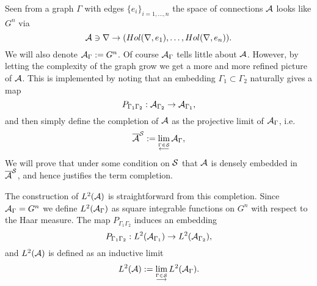 \documentclass[12pt]{article}
\def\ca{{\cal A}}
\def\cs{{\cal S}}
\begin{document}
Seen from a graph $\Gamma$ with edges $\{e_i\}_{i=1,\ldots ,n}$ the space of connections $\ca$ looks like $G^{n}$ via
$$\ca \ni \nabla \to (Hol(\nabla, e_1 ),\ldots ,Hol(\nabla ,e_{n})).$$
We will also denote $\ca_\Gamma :=G^n$. Of course $\ca_\Gamma$ tells little about $\ca$. However, by letting the complexity of the graph grow we get a more and more refined picture of $\ca$. This is implemented by noting that an embedding $\Gamma_1 \subset \Gamma_2$ naturally gives a map
$$P_{\Gamma_1\Gamma_2}:\ca_{\Gamma_2}\to \ca_{\Gamma_1},$$
and then simply define the completion of $\ca$ as the projective limit of $\ca_\Gamma$, i.e.
$$\overline{\ca}^\cs:=\lim_{\stackrel{\Gamma \in \cs}{\longleftarrow} }\ca_\Gamma,$$
We will prove that under some condition on $\cs$ that $\ca$ is densely embedded in  $\overline{\ca}^\cs$, and hence justifies the term completion.

The construction of $L^2(\ca)$ is straightforward from this completion. Since $\ca_\Gamma =G^n$ we define $L^2(\ca_\Gamma )$ as square integrable functions on $G^n$ with respect to the Haar measure. The map $P_{\Gamma_1 \Gamma_2}$ induces an embedding
$$P_{\Gamma_1 \Gamma_2}:L^2 (\ca_{\Gamma_1})\to L^2(\ca_{\Gamma_2}),$$
and $L^2(\ca)$ is defined as an inductive limit
$$L^2(\ca ):=\lim_{\stackrel{\Gamma \in \cs}{\longrightarrow} }L^2(\ca_\Gamma).$$

\end{document}
